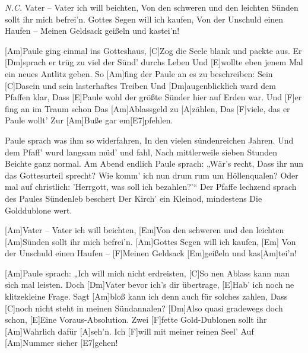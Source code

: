 

\begin{guitar}
	 {\footnotesize\textit{N.C.}}
	Vater – Vater ich will beichten,
	Von den schweren und den leichten Sünden sollt ihr mich befrei'n.
	Gottes Segen will ich kaufen,
	Von der Unschuld einen Haufen – Meinen Geldsack geißeln und kastei'n!
	
	[Am]Paule ging einmal ins Gotteshaus,
	[C]Zog die Seele blank und packte aus.
	Er [Dm]sprach er trüg zu viel der Sünd' durchs Leben
	Und [E]wollte eben jenem Mal ein neues Antlitz geben.
	So [Am]fing der Paule an es zu beschreiben:
	Sein [C]Dasein und sein lasterhaftes Treiben
	Und [Dm]augenblicklich ward dem Pfaffen klar,
	Dass [E]Paule wohl der größte Sünder hier auf Erden war.
	Und [F]er fing an im Traum schon
	Das [Am]Ablassgeld zu [A]zählen,
	Das [F]viele, das er Paule wollt'
	Zur [Am]Buße gar em[E7]pfehlen.
	
	Paule sprach was ihm so widerfahren,
	In den vielen sündenreichen Jahren.
	Und dem Pfaff' wurd langsam müd' und fahl,
	Nach mittlerweile sieben Stunden Beichte ganz normal.
	Am Abend endlich Paule sprach: „Wär's recht,
	Dass ihr nun das Gottesurteil sprecht?
	Wie komm' ich nun drum rum um Höllenqualen?
	Oder mal auf christlich: 'Herrgott, was soll ich bezahlen?'“
	Der Pfaffe lechzend sprach des Paules 
	Sündenleb beschert
	Der Kirch' ein Kleinod, mindestens
	Die Golddublone wert.
	
	[Am]Vater – Vater ich will beichten,
	[Em]Von den schweren und den leichten [Am]Sünden sollt ihr mich befrei'n. 
	[Am]Gottes Segen will ich kaufen,
	[Em] Von der Unschuld einen Haufen – [F]Meinen Geldsack [Em]geißeln und kas[Am]tei'n!
	
	[Am]Paule sprach: „Ich will mich nicht erdreisten,
	[C]So nen Ablass kann man sich mal leisten.
	Doch [Dm]Vater bevor ich's dir übertrage,
	[E]Hab' ich noch ne klitzekleine Frage.
	Sagt [Am]bloß kann ich denn auch für solches zahlen,
	Dass [C]noch nicht steht in meinen Sündannalen?
	[Dm]Also quasi gradewegs doch schon,
	[E]Eine Voraus-Absolution.
	Zwei [F]fette Gold-Dublonen sollt ihr 
	[Am]Wahrlich dafür [A]seh'n.
	Ich [F]will mit meiner reinen Seel'
	Auf [Am]Nummer sicher [E7]gehen!
	

\end{guitar}
